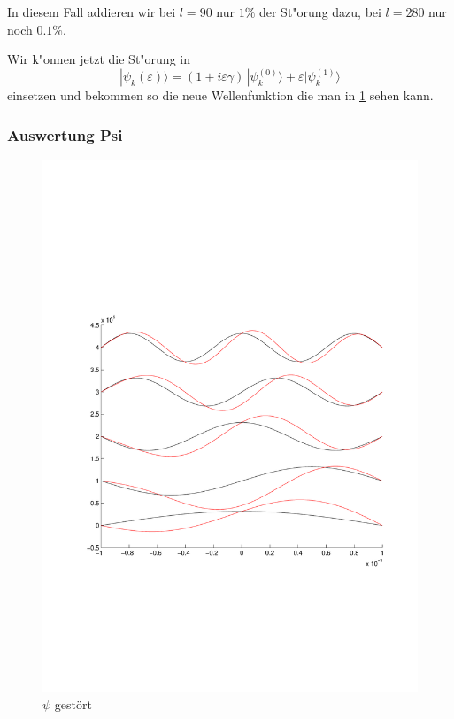 \begin{refsection}
In diesem Fall addieren wir bei $l=90$ nur $1\%$ der St"orung dazu, bei $l=280$ nur noch $0.1\%$.

Wir k"onnen jetzt die St"orung in 
\begin{equation}
|\psi_k(\varepsilon)\rangle
=
(1+i\varepsilon \gamma)
\,|\psi_k^{(0)}\rangle
+
\varepsilon|\psi_k^{(1)}\rangle
\end{equation}
einsetzen und bekommen so die neue Wellenfunktion die man in \ref{abb:efeld_psi_gestoert} sehen kann.


















\subsubsection{Auswertung Psi}

\begin{figure}
 \centering
 \includegraphics[width=12cm,clip=true,trim=2cm 7cm 1cm 8cm]{efeld/Psi_gestoert.pdf}
 \caption{$\psi$ gest\"ort}
 \label{abb:efeld_psi_gestoert}
\end{figure}


\end{refsection}
